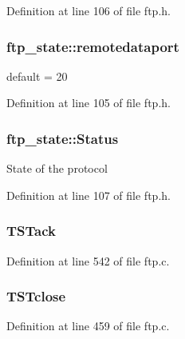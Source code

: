 Definition at line 106 of file ftp.h.

\hypertarget{group__ftp_ga0aead28a817643dacb4df95807ab8ddf}{
\subsubsection[{remotedataport}]{ {\bf ftp\_\-state::remotedataport}}}
\label{group__ftp_ga0aead28a817643dacb4df95807ab8ddf}
default = 20 

Definition at line 105 of file ftp.h.

\hypertarget{group__ftp_gaaa4d97116ea038c00c8909bffd58129f}{
\subsubsection[{Status}]{ {\bf ftp\_\-state::Status}}}
\label{group__ftp_gaaa4d97116ea038c00c8909bffd58129f}
State of the protocol 

Definition at line 107 of file ftp.h.

\hypertarget{group__ftp_ga2883c4fc99d30339045c0b359ca0edf1}{
\subsubsection[{TSTack}]{ {\bf TSTack}}}
\label{group__ftp_ga2883c4fc99d30339045c0b359ca0edf1}


Definition at line 542 of file ftp.c.

\hypertarget{group__ftp_gaeaad4e8dd2932fd22eafc9f7a72aef13}{
\subsubsection[{TSTclose}]{ {\bf TSTclose}}}
\label{group__ftp_gaeaad4e8dd2932fd22eafc9f7a72aef13}


Definition at line 459 of file ftp.c.

